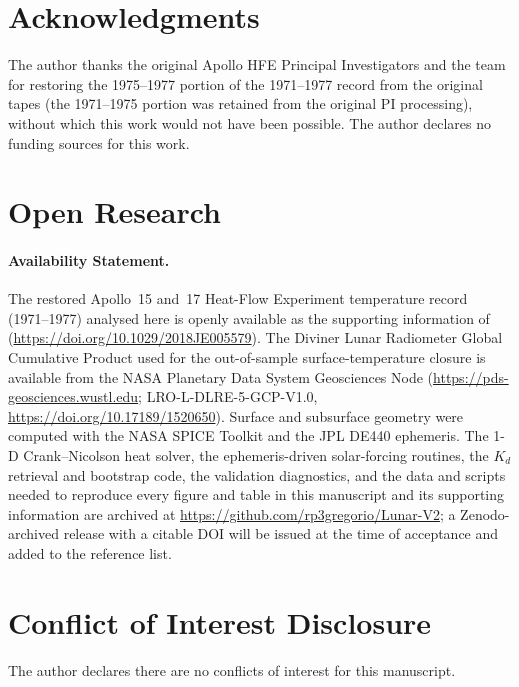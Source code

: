 \documentclass[11pt]{article}
\begin{document}
\section*{Acknowledgments}
The author thanks the original Apollo HFE Principal Investigators
and the \citet{nagihara2018} team for restoring the
1975--1977 portion of the 1971--1977 record from the original tapes
(the 1971--1975 portion was retained from the original PI processing),
without which this work would not have been possible. The author
declares no funding sources for this work.

\section*{Open Research}
\paragraph*{Availability Statement.}
The restored Apollo~15 and~17 Heat-Flow Experiment temperature
record (1971--1977) analysed here is openly available as the
supporting information of \citet{nagihara2018}
(\url{https://doi.org/10.1029/2018JE005579}). The Diviner Lunar
Radiometer Global Cumulative Product used for the out-of-sample
surface-temperature closure \citep{williams2017diviner} is available
from the NASA Planetary Data System Geosciences Node
(\url{https://pds-geosciences.wustl.edu}; LRO-L-DLRE-5-GCP-V1.0,
\url{https://doi.org/10.17189/1520650}). Surface and subsurface
geometry were computed with the NASA SPICE Toolkit
\citep{acton1996,acton2018} and the JPL DE440 ephemeris. The 1-D
Crank--Nicolson heat solver, the ephemeris-driven solar-forcing
routines, the $K_d$ retrieval and bootstrap code, the validation
diagnostics, and the data and scripts needed to reproduce every
figure and table in this manuscript and its supporting information
are archived at \url{https://github.com/rp3gregorio/Lunar-V2}; a
Zenodo-archived release with a citable DOI will be issued at the
time of acceptance and added to the reference list.

\section*{Conflict of Interest Disclosure}
The author declares there are no conflicts of interest for this
manuscript.

\end{document}
